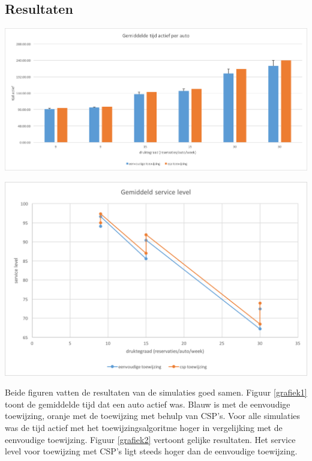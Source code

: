 \documentclass[a0,portrait]{a0poster}
\begin{document}
\begin{multicols}{2}
\color{HoGentAccent1} 
\section*{Resultaten}
\color{black}


\begin{center}\vspace{1cm}
\includegraphics[width=1.0\linewidth]{grafiek-gemiddelde-tijd-actief-per-auto.png}
\label{grafiek1}
\end{center}\vspace{1cm}
\begin{center}\vspace{1cm}
	\includegraphics[width=1.0\linewidth]{grafiek-gemiddeld-service-level.png}
	\label{grafiek2}
\end{center}\vspace{1cm}
Beide figuren vatten de resultaten van de simulaties goed samen. Figuur  \ref{grafiek1} toont de gemiddelde tijd dat een auto actief was. Blauw is met de eenvoudige toewijzing, oranje met de toewijzing met behulp van CSP's. Voor alle simulaties was de tijd actief met het toewijzingsalgoritme hoger in vergelijking met de eenvoudige toewijzing. Figuur \ref{grafiek2} vertoont gelijke resultaten. Het service level voor toewijzing met CSP's ligt steeds hoger dan de eenvoudige toewijzing.


\end{multicols}
\end{document}
